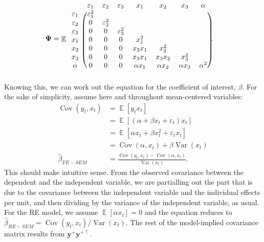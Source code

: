 \documentclass[]{interact}
\theoremstyle{plain}%
\theoremstyle{definition}
\theoremstyle{remark}
\begin{document}
\begin{align}
\bm{\Psi} & = \mathop{\mathrm{\mathbb{E}}}
\begin{blockarray}{cccccccc}
 & \varepsilon_{1} & \varepsilon_{2} & \varepsilon_{3} & x_{1} & x_{2} & x_{3} & \alpha \\
 \begin{block}{c(ccccccc)}
 \varepsilon_{1} & \varepsilon_{1}^{2} &                     &                     &              &              &              & \\
 \varepsilon_{2} & 0                   & \varepsilon_{2}^{2} &                     &              &              &              & \\
 \varepsilon_{3} & 0                   & 0                   & \varepsilon_{3}^{2} &              &              &              & \\
 x_{1}           & 0                   & 0                   & 0                   & x_{1}^{2}    &              &              & \\
 x_{2}           & 0                   & 0                   & 0                   & x_{2}x_{1}   & x_{2}^{2}    &              & \\
 x_{3}           & 0                   & 0                   & 0                   & x_{3}x_{1}   & x_{3}x_{2}   & x_{3}^{2}    & \\
 \alpha          & 0                   & 0                   & 0                   & \alpha x_{1} & \alpha x_{2} & \alpha x_{3} & \alpha^{2} \\
 \end{block}
\end{blockarray}.
\end{align} Knowing this, we can work out the equation for the
coefficient of interest, \(\beta\). For the sake of simplicity, assume
here and throughout mean-centered variables: \begin{align}
\mathop{\mathrm{\mathrm{Cov}}}(y_{t},x_{t}) & = \mathop{\mathrm{\mathbb{E}}}[y_{t}x_{t}] \\
 & = \mathop{\mathrm{\mathbb{E}}}[(\alpha + \beta x_{t} + \varepsilon_{t})x_{t}] \\
 & = \mathop{\mathrm{\mathbb{E}}}[\alpha x_{t} + \beta x_{t}^{2} + \varepsilon_{t}x_{t}] \\
 & = \mathop{\mathrm{\mathrm{Cov}}}(\alpha, x_{t}) + \beta \mathop{\mathrm{\mathrm{Var}}}(x_{t}) \\
\hat{\beta}_{FE-SEM} & = \frac{\mathop{\mathrm{\mathrm{Cov}}}(y_{t},x_{t}) - \mathop{\mathrm{\mathrm{Cov}}}(\alpha, x_{t})}{\mathop{\mathrm{\mathrm{Var}}}(x_{t})}. 
\end{align} This should make intuitive sense. From the observed
covariance between the dependent and the independent variable, we are
partialling out the part that is due to the covariance between the
independent variable and the individual effects per unit, and then
dividing by the variance of the independent variable, as usual. For the
RE model, we assume \(\mathop{\mathrm{\mathbb{E}}}[\alpha x_{t}] = 0\)
and the equation reduces to
\(\hat{\beta}_{RE-SEM} = \mathop{\mathrm{\mathrm{Cov}}}(y_{t},x_{t})/\mathop{\mathrm{\mathrm{Var}}}(x_{t})\).
The rest of the model-implied covariance matrix results from
\(\bm{y}^{+}\bm{y}^{+ \intercal}\).
\end{document}
